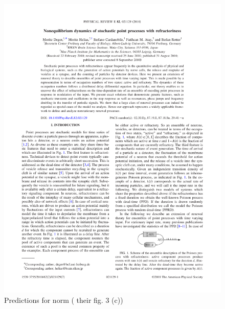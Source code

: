 
\begin{figure}[h]
	\centering
	\includegraphics*[page=4,viewport=308 567 441 617]{images/Deger2010.pdf} %
	\caption{Predictions for norm (\cite{Deger}  their fig. 3 (c))}
	\label{fig:prednorm}
\end{figure}

